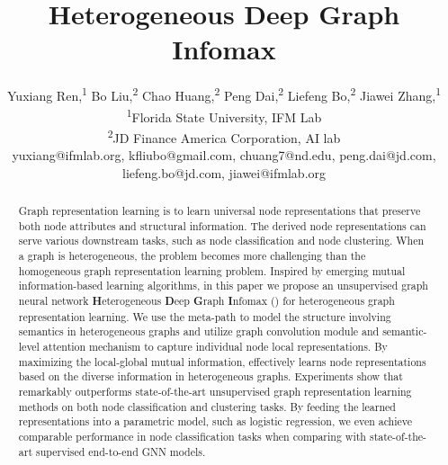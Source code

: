\documentclass[conference]{IEEEtran}
\begin{document}
	
	\title{Heterogeneous Deep Graph Infomax}	
	
\author{Yuxiang Ren,\textsuperscript{1}
		Bo Liu,\textsuperscript{2}
		Chao Huang,\textsuperscript{2}
		Peng Dai,\textsuperscript{2}
		Liefeng Bo,\textsuperscript{2}
		Jiawei Zhang,\textsuperscript{1}\\
		\textsuperscript{1}{Florida State University, IFM Lab}\\
		\textsuperscript{2}{JD Finance America Corporation, AI lab}\\
		yuxiang@ifmlab.org,
		kfliubo@gmail.com,
		chuang7@nd.edu,
		peng.dai@jd.com,
		liefeng.bo@jd.com,
		jiawei@ifmlab.org}
\maketitle	
	\begin{abstract}
		Graph representation learning is to learn universal node representations that preserve both node attributes and structural information. The derived node representations can serve various downstream tasks, such as node classification and node clustering. 
		When a graph is heterogeneous, the problem becomes more challenging than the homogeneous graph representation learning problem. Inspired by emerging mutual information-based learning algorithms, in this paper we propose an unsupervised graph neural network \textbf{H}eterogeneous \textbf{D}eep \textbf{G}raph \textbf{I}nfomax ({\our}) for heterogeneous graph representation learning. We use the meta-path to model the structure involving semantics in heterogeneous graphs and utilize graph convolution module and semantic-level attention mechanism to capture individual node local representations. By maximizing the local-global mutual information, {\our} effectively learns node representations based on the diverse information in heterogeneous graphs. 
		Experiments show that {\our} remarkably outperforms state-of-the-art unsupervised graph representation learning methods on both node classification and clustering tasks. By feeding the learned representations into a parametric model, such as logistic regression, 
		we even achieve comparable performance in node classification tasks when comparing with state-of-the-art supervised end-to-end GNN models.
		
		
	\end{abstract}
	
\maketitle
	
\end{document}
